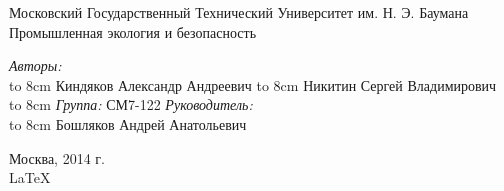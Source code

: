 \documentclass{article}
\begin{document}
\begin{titlepage}
\begin{center}
    {\large Московский Государственный Технический Университет им. Н. Э. Баумана}
    \\[5cm]
    {\Large Промышленная экология и безопасность}
    \\[5cm]

    \begin{flushright}
        \begin{minipage}{0.5\textwidth}
            \begin{flushleft}
                \textit{Авторы:} \\
                \hbox to 8cm {Киндяков Александр Андреевич \hfil \underline{\hspace{2cm} } }
                \vspace{\baselineskip}
                \hbox to 8cm {Никитин Сергей Владимирович \hfil \underline{\hspace{2cm} } }
                \vspace{\baselineskip}
                \hbox to 8cm {\textit{Группа:} \hfil СМ7-122}
                \vspace{2cm}
                \textit{Руководитель:} \\
                \hbox to 8cm {Бошляков Андрей Анатольевич \hfil \underline{\hspace{2cm} } }
            \end{flushleft}
        \end{minipage}
    \end{flushright}

    \vfill %
    Москва, 2014 г. \\
    \LaTeX
\end{center}
\end{titlepage}

\tableofcontents


\newpage
\begin{thebibliography}{30}
    
\end{thebibliography}
\end{document}

